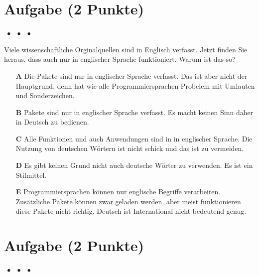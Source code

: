 \documentclass[a4paper, 9pt]{scrartcl}\usepackage[]{graphicx}\usepackage[]{xcolor}
\begin{document}
\section{Aufgabe \hfill (2 Punkte)}

\ifcollection
\begin{flushright}
\tiny\vspace{-2Ex}
\textbf{\examinhaltstart}
\exammodulemathstat $\;\bullet$
\exammodulestat $\;\bullet$
\exammodulestatversuch $\;\bullet$
\exammodulebiostat
\vspace{-1Ex}
\end{flushright}
\fi




Viele wissenschaftliche Orginalquellen sind in Englisch verfasst. Jetzt finden Sie heraus, dass auch \Rlogo nur in englischer Sprache funktioniert. Warum ist das so?



\begin{enumerate}
\item [\textbf{A} \msquare] Die \Rlogo Pakete sind nur in englischer Sprache verfasst. Das ist aber nicht der Hauptgrund, denn \Rlogo hat wie alle Programmiersprachen Probelem mit Umlauten und Sonderzeichen.
\item [\textbf{B} \msquare] \Rlogo Pakete sind nur in englischer Sprache verfasst. Es macht keinen Sinn \Rlogo daher in Deutsch zu bedienen.
\item [\textbf{C} \msquare] Alle Funktionen und auch Anwendungen sind in \Rlogo in englischer Sprache. Die Nutzung von deutschen Wörtern ist nicht schick und das ist zu vermeiden.
\item [\textbf{D} \msquare] Es gibt keinen Grund nicht auch deutsche Wörter zu verwenden. Es ist ein Stilmittel.
\item [\textbf{E} \msquare] Programmiersprachen können nur englische Begriffe verarbeiten. Zusätzliche Pakete können zwar geladen werden, aber meist funktionieren diese Pakete nicht richtig. Deutsch ist International nicht bedeutend genug.
\end{enumerate} 

\section{Aufgabe \hfill (2 Punkte)}

\ifcollection
\begin{flushright}
\tiny\vspace{-2Ex}
\textbf{\examinhaltstart}
\exammodulemathstat $\;\bullet$
\exammodulestat $\;\bullet$
\exammodulestatversuch $\;\bullet$
\exammodulebiostat
\vspace{-1Ex}
\end{flushright}
\fi
\end{document}
